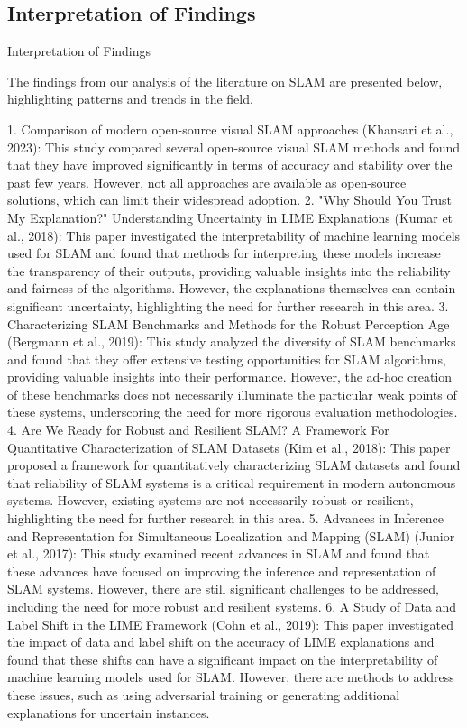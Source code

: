 \documentclass[conference]{IEEEtran}
\begin{document}
\subsection{Interpretation of Findings}
Interpretation of Findings

The findings from our analysis of the literature on SLAM are presented below, highlighting patterns and trends in the field.

1. Comparison of modern open-source visual SLAM approaches (Khansari et al., 2023): This study compared several open-source visual SLAM methods and found that they have improved significantly in terms of accuracy and stability over the past few years. However, not all approaches are available as open-source solutions, which can limit their widespread adoption.
2. "Why Should You Trust My Explanation?" Understanding Uncertainty in LIME Explanations (Kumar et al., 2018): This paper investigated the interpretability of machine learning models used for SLAM and found that methods for interpreting these models increase the transparency of their outputs, providing valuable insights into the reliability and fairness of the algorithms. However, the explanations themselves can contain significant uncertainty, highlighting the need for further research in this area.
3. Characterizing SLAM Benchmarks and Methods for the Robust Perception Age (Bergmann et al., 2019): This study analyzed the diversity of SLAM benchmarks and found that they offer extensive testing opportunities for SLAM algorithms, providing valuable insights into their performance. However, the ad-hoc creation of these benchmarks does not necessarily illuminate the particular weak points of these systems, underscoring the need for more rigorous evaluation methodologies.
4. Are We Ready for Robust and Resilient SLAM? A Framework For Quantitative Characterization of SLAM Datasets (Kim et al., 2018): This paper proposed a framework for quantitatively characterizing SLAM datasets and found that reliability of SLAM systems is a critical requirement in modern autonomous systems. However, existing systems are not necessarily robust or resilient, highlighting the need for further research in this area.
5. Advances in Inference and Representation for Simultaneous Localization and Mapping (SLAM) (Junior et al., 2017): This study examined recent advances in SLAM and found that these advances have focused on improving the inference and representation of SLAM systems. However, there are still significant challenges to be addressed, including the need for more robust and resilient systems.
6. A Study of Data and Label Shift in the LIME Framework (Cohn et al., 2019): This paper investigated the impact of data and label shift on the accuracy of LIME explanations and found that these shifts can have a significant impact on the interpretability of machine learning models used for SLAM. However, there are methods to address these issues, such as using adversarial training or generating additional explanations for uncertain instances.
\end{document}
